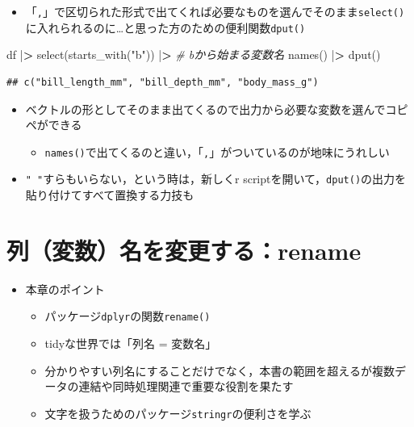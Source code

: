 \documentclass[
  xelatex,ja=standard, b5paper]{bxjsbook}
\newenvironment{Shaded}{\begin{snugshade}}{\end{snugshade}}
\newcommand{\CommentTok}[1]{\textcolor[rgb]{0.56,0.35,0.01}{\textit{#1}}}
\newcommand{\ErrorTok}[1]{\textcolor[rgb]{0.64,0.00,0.00}{\textbf{#1}}}
\newcommand{\FunctionTok}[1]{\textcolor[rgb]{0.00,0.00,0.00}{#1}}
\newcommand{\NormalTok}[1]{#1}
\newcommand{\SpecialCharTok}[1]{\textcolor[rgb]{0.00,0.00,0.00}{#1}}
\newcommand{\StringTok}[1]{\textcolor[rgb]{0.31,0.60,0.02}{#1}}
\providecommand{\tightlist}{%
  \setlength{\itemsep}{0pt}\setlength{\parskip}{0pt}}
\begin{document}
\begin{itemize}
\tightlist
\item
  「\texttt{,}」で区切られた形式で出てくれば必要なものを選んでそのまま\texttt{select()}に入れられるのに\ldots と思った方のための便利関数\texttt{dput()}
\end{itemize}

\begin{Shaded}
\begin{Highlighting}[]
\NormalTok{df }\SpecialCharTok{|}\ErrorTok{\textgreater{}} 
  \FunctionTok{select}\NormalTok{(}\FunctionTok{starts\_with}\NormalTok{(}\StringTok{"b"}\NormalTok{)) }\SpecialCharTok{|}\ErrorTok{\textgreater{}} \CommentTok{\# bから始まる変数名}
  \FunctionTok{names}\NormalTok{() }\SpecialCharTok{|}\ErrorTok{\textgreater{}} 
  \FunctionTok{dput}\NormalTok{()}
\end{Highlighting}
\end{Shaded}

\begin{verbatim}
## c("bill_length_mm", "bill_depth_mm", "body_mass_g")
\end{verbatim}

\begin{itemize}
\tightlist
\item
  ベクトルの形としてそのまま出てくるので出力から必要な変数を選んでコピペができる

  \begin{itemize}
  \tightlist
  \item
    \texttt{names()}で出てくるのと違い，「\texttt{,}」がついているのが地味にうれしい
  \end{itemize}
\item
  \texttt{"\ "}すらもいらない，という時は，新しくr scriptを開いて，\texttt{dput()}の出力を貼り付けてすべて置換する力技も
\end{itemize}

\hypertarget{rename}{%
\chapter{列（変数）名を変更する：rename}\label{rename}}

\begin{itemize}
\tightlist
\item
  本章のポイント

  \begin{itemize}
  \tightlist
  \item
    パッケージ\texttt{dplyr}の関数\texttt{rename()}\\
  \item
    tidyな世界では「列名 = 変数名」\\
  \item
    分かりやすい列名にすることだけでなく，本書の範囲を超えるが複数データの連結や同時処理関連で重要な役割を果たす\\
  \item
    文字を扱うためのパッケージ\texttt{stringr}の便利さを学ぶ
  \end{itemize}
\end{itemize}
\end{document}
